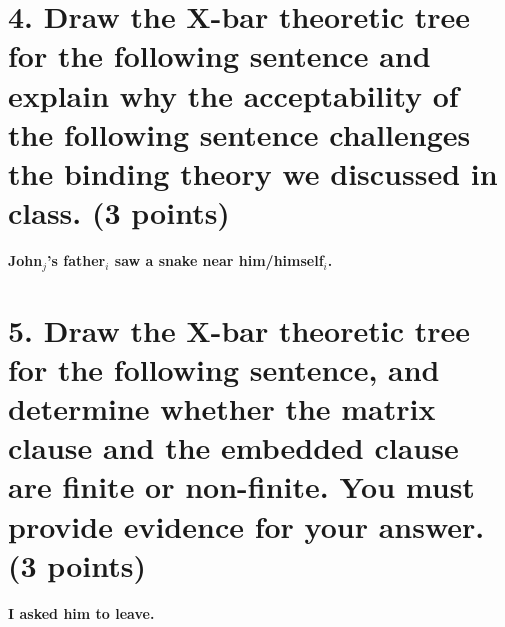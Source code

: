\documentclass{article}
\begin{document}
\section{4. Draw the X-bar theoretic tree for the following sentence and explain why the acceptability of the following sentence challenges the binding theory we discussed in class. \normalsize{(3 points)}}
\medskip
\begin{center}
     \textbf{John$_j$'s father$_i$ saw a snake near him/himself$_i$.}
\end{center}

\newpage
\section{5. Draw the X-bar theoretic tree for the following sentence, and determine whether the matrix clause and the embedded clause are finite or non-finite. You must provide evidence for your answer. \normalsize{(3 points)}}
\medskip
\begin{center} 
    \textbf{I asked him to leave.}
\end{center}
\end{document}
